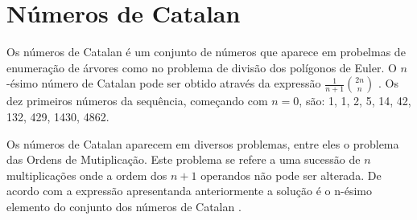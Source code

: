 \chapter{Números de Catalan}
Os números de Catalan é um conjunto de números que aparece em probelmas de enumeração de árvores como no problema de divisão dos polígonos de Euler. O $n$-ésimo número de Catalan pode ser obtido através da expressão $\frac{1}{n+1} \binom{2n}{n} $ \cite{wolfram}. Os dez primeiros números da sequência, começando com $n = 0$, são: 1, 1, 2, 5, 14, 42, 132, 429, 1430, 4862.

Os números de Catalan aparecem em diversos problemas, entre eles o problema das Ordens de Mutiplicação.
Este problema se refere a uma sucessão de $n$ multiplicações onde a ordem dos $n+1$ operandos não pode ser alterada. De acordo com a expressão apresentanda anteriormente a solução é o n-ésimo elemento do conjunto dos números de Catalan \cite{catNum}.
